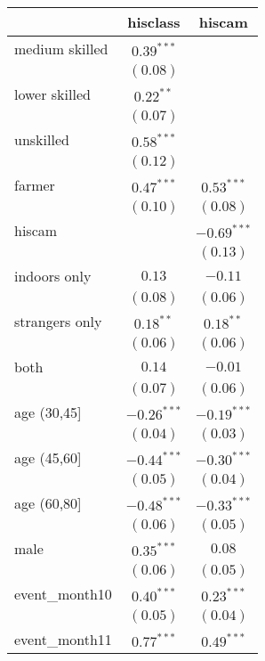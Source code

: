
\begin{table}
\begin{center}
\begin{tabular}{l c c}
\hline
 & hisclass & hiscam \\
\hline
medium skilled & $0.39^{***}$  &               \\
               & $(0.08)$      &               \\
lower skilled  & $0.22^{**}$   &               \\
               & $(0.07)$      &               \\
unskilled      & $0.58^{***}$  &               \\
               & $(0.12)$      &               \\
farmer         & $0.47^{***}$  & $0.53^{***}$  \\
               & $(0.10)$      & $(0.08)$      \\
hiscam         &               & $-0.69^{***}$ \\
               &               & $(0.13)$      \\
indoors only   & $0.13$        & $-0.11$       \\
               & $(0.08)$      & $(0.06)$      \\
strangers only & $0.18^{**}$   & $0.18^{**}$   \\
               & $(0.06)$      & $(0.06)$      \\
both           & $0.14$        & $-0.01$       \\
               & $(0.07)$      & $(0.06)$      \\
age (30,45]    & $-0.26^{***}$ & $-0.19^{***}$ \\
               & $(0.04)$      & $(0.03)$      \\
age (45,60]    & $-0.44^{***}$ & $-0.30^{***}$ \\
               & $(0.05)$      & $(0.04)$      \\
age (60,80]    & $-0.48^{***}$ & $-0.33^{***}$ \\
               & $(0.06)$      & $(0.05)$      \\
male           & $0.35^{***}$  & $0.08$        \\
               & $(0.06)$      & $(0.05)$      \\
event\_month10 & $0.40^{***}$  & $0.23^{***}$  \\
               & $(0.05)$      & $(0.04)$      \\
event\_month11 & $0.77^{***}$  & $0.49^{***}$  \\

\end{tabular}
\end{center}
\end{table}
